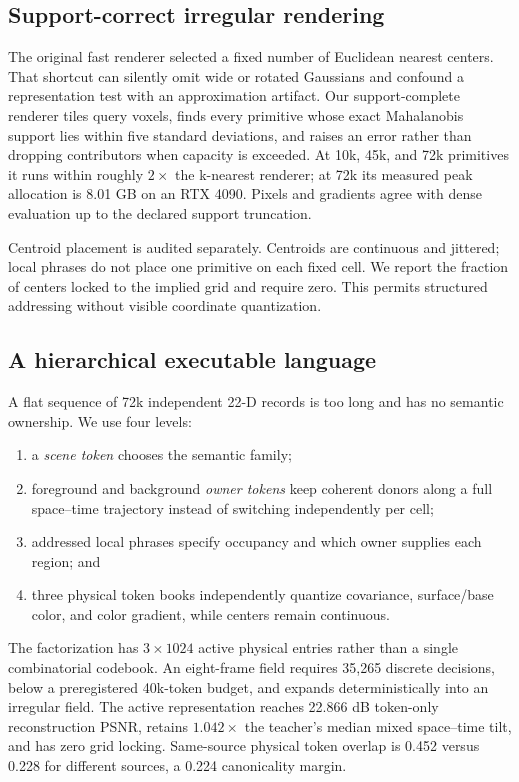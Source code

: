\documentclass{article}
\begin{document}
\subsection{Support-correct irregular rendering}

The original fast renderer selected a fixed number of Euclidean nearest centers. That shortcut can
silently omit wide or rotated Gaussians and confound a representation test with an approximation
artifact. Our support-complete renderer tiles query voxels, finds every primitive whose exact
Mahalanobis support lies within five standard deviations, and raises an error rather than dropping
contributors when capacity is exceeded. At 10k, 45k, and 72k primitives it runs within roughly
$2\times$ the k-nearest renderer; at 72k its measured peak allocation is 8.01 GB on an RTX 4090.
Pixels and gradients agree with dense evaluation up to the declared support truncation.

Centroid placement is audited separately. Centroids are continuous and jittered; local phrases do
not place one primitive on each fixed cell. We report the fraction of centers locked to the implied
grid and require zero. This permits structured addressing without visible coordinate quantization.

\subsection{A hierarchical executable language}

A flat sequence of 72k independent 22-D records is too long and has no semantic ownership. We use
four levels:
\begin{enumerate}
  \item a \emph{scene token} chooses the semantic family;
  \item foreground and background \emph{owner tokens} keep coherent donors along a full
  space--time trajectory instead of switching independently per cell;
  \item addressed local phrases specify occupancy and which owner supplies each region; and
  \item three physical token books independently quantize covariance, surface/base color, and
  color gradient, while centers remain continuous.
\end{enumerate}
The factorization has $3\times1024$ active physical entries rather than a single combinatorial
codebook. An eight-frame field requires 35,265 discrete decisions, below a preregistered 40k-token
budget, and expands deterministically into an irregular field. The active representation reaches
22.866 dB token-only reconstruction PSNR, retains $1.042\times$ the teacher's median mixed
space--time tilt, and has zero grid locking. Same-source physical token overlap is 0.452 versus
0.228 for different sources, a 0.224 canonicality margin.
\end{document}
